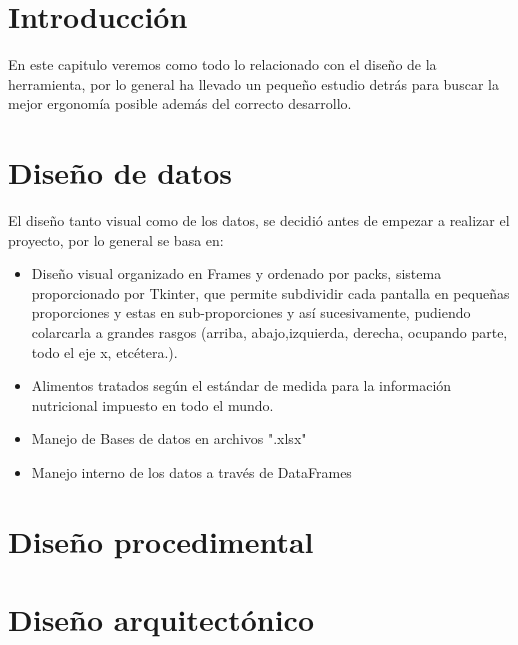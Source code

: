 
\section{Introducción}
En este capitulo veremos como todo lo relacionado con el diseño de la herramienta, por lo general ha llevado un pequeño estudio detrás para buscar la mejor ergonomía posible además del correcto desarrollo.
\section{Diseño de datos}
El diseño tanto visual como de los datos, se decidió antes de empezar a realizar el proyecto, por lo general se basa en:
\begin{itemize}
\item Diseño visual organizado en Frames y ordenado por packs, sistema proporcionado por Tkinter, que permite subdividir cada pantalla en pequeñas proporciones y estas en sub-proporciones y así sucesivamente, pudiendo colarcarla a grandes rasgos (arriba, abajo,izquierda, derecha, ocupando parte, todo el eje x, etcétera.).
\item Alimentos tratados según el estándar de medida para la información nutricional impuesto en todo el mundo.
\item Manejo de Bases de datos en archivos ".xlsx"
\item Manejo interno de los datos a través de DataFrames
\end{itemize}
\section{Diseño procedimental}

\section{Diseño arquitectónico}


